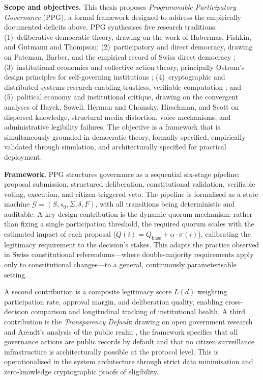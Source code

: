 \documentclass[12pt,a4paper,oneside]{report}
\begin{document}
\vspace{0.7em}
\noindent\textbf{Scope and objectives.}
This thesis proposes \emph{Programmable Participatory Governance} (PPG), a formal framework designed to address the empirically documented deficits above. PPG synthesises five research traditions: (1)~deliberative democratic theory, drawing on the work of Habermas, Fishkin, and Gutmann and Thompson; (2)~participatory and direct democracy, drawing on Pateman, Barber, and the empirical record of Swiss direct democracy \citep{linder2010swiss, frey1994direct}; (3)~institutional economics and collective action theory, principally Ostrom's design principles for self-governing institutions \citep{ostrom1990governing}; (4)~cryptographic and distributed systems research enabling trustless, verifiable computation \citep{buterin2014ethereum, boneh2020graduate}; and (5)~political economy and institutional critique, drawing on the convergent analyses of Hayek, Sowell, Herman and Chomsky, Hirschman, and Scott on dispersed knowledge, structural media distortion, voice mechanisms, and administrative legibility failures. The objective is a framework that is simultaneously grounded in democratic theory, formally specified, empirically validated through simulation, and architecturally specified for practical deployment.

\vspace{0.7em}
\noindent\textbf{Framework.}
PPG structures governance as a sequential six-stage pipeline: proposal submission, structured deliberation, constitutional validation, verifiable voting, execution, and citizen-triggered veto. The pipeline is formalised as a state machine $\mathcal{G} = (S, s_0, \Sigma, \delta, F)$, with all transitions being deterministic and auditable. A key design contribution is the dynamic quorum mechanism: rather than fixing a single participation threshold, the required quorum scales with the estimated impact of each proposal ($Q(i) = Q_{\text{base}} + \alpha\cdot\sigma(i)$), calibrating the legitimacy requirement to the decision's stakes. This adapts the practice observed in Swiss constitutional referendums---where double-majority requirements apply only to constitutional changes---to a general, continuously parameterisable setting.

A second contribution is a composite legitimacy score $L(d)$ weighting participation rate, approval margin, and deliberation quality, enabling cross-decision comparison and longitudinal tracking of institutional health. A third contribution is the \emph{Transparency Default}: drawing on open government research \citep{oecd2020open} and Arendt's analysis of the public realm \citep{arendt1958human}, the framework specifies that all governance actions are public records by default and that no citizen surveillance infrastructure is architecturally possible at the protocol level. This is operationalised in the system architecture through strict data minimisation and zero-knowledge cryptographic proofs of eligibility.
\end{document}
